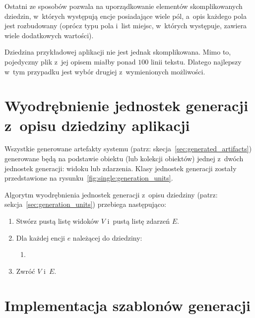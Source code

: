 


Ostatni ze sposobów pozwala na uporządkowanie elementów skomplikowanych dziedzin, w~których występują encje posiadające wiele pól, a~opis każdego pola jest rozbudowany (oprócz typu pola i~list miejsc, w~których występuje, zawiera wiele dodatkowych wartości).

Dziedzina przykładowej aplikacji nie jest jednak skomplikowana.
Mimo to, pojedyczny plik z~jej opisem miałby ponad $100$ linii tekstu.
Dlatego najlepszy w~tym przypadku jest wybór drugiej z~wymienionych możliwości.



\section{Wyodrębnienie jednostek generacji z~opisu dziedziny aplikacji} \label{sec:gen_units_extraction}

Wszystkie generowane artefakty systemu (patrz: skecja~\ref{sec:generated_artifacts}) generowane będą na podstawie obiektu (lub kolekcji obiektów) jednej z~dwóch jednostek generacji: widoku lub zdarzenia.
Klasy jednostek generacji zostały przedstawione na rysunku~\ref{fig:single:generation_units}.



Algorytm wyodrębnienia jednostek generacji z~opisu dziedziny (patrz: sekcja~\ref{sec:generation_units}) przebiega następująco:

\begin{enumerate}
 \item Stwórz pustą listę widoków $V$ i~pustą listę zdarzeń $E$.
 \item Dla każdej encji $e$ należącej do dziedziny:
  \begin{enumerate}
   \item 
  \end{enumerate}
 \item Zwróć $V$ i~$E$.

\end{enumerate}



\section{Implementacja szablonów generacji}

